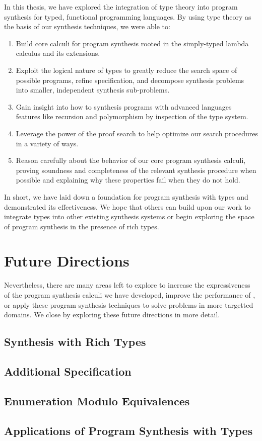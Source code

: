 In this thesis, we have explored the integration of type theory into program synthesis for typed, functional programming languages.
By using type theory as the basis of our synthesis techniques, we were able to:
\begin{enumerate}
  \item Build core calculi for program synthesis rooted in the simply-typed lambda calculus and its extensions.
  \item Exploit the logical nature of types to greatly reduce the search space of possible programs, refine specification, and decompose synthesis problems into smaller, independent synthesis sub-problems.
  \item Gain insight into how to synthesis programs with advanced languages features like recursion and polymorphism by inspection of the type system.
  \item Leverage the power of the proof search to help optimize our search procedures in a variety of ways.
  \item Reason carefully about the behavior of our core program synthesis calculi, proving soundness and completeness of the relevant synthesis procedure when possible and explaining why these properties fail when they do not hold.
\end{enumerate}
In short, we have laid down a foundation for program synthesis with types and demonstrated its effectiveness.
We hope that others can build upon our work to integrate types into other existing synthesis systems or begin exploring the space of program synthesis in the presence of rich types.

\section{Future Directions}
\label{sec:future-directions}

Nevertheless, there are many areas left to explore to increase the expressiveness of the program synthesis calculi we have developed, improve the performance of \myth{}, or apply these program synthesis techniques to solve problems in more targetted domains.
We close by exploring these future directions in more detail.

\subsection{Synthesis with Rich Types}
\label{subsec:synthesis-with-rich-types}

\subsection{Additional Specification}
\label{subsec:additional-specification}

\subsection{Enumeration Modulo Equivalences}
\label{subsec:enumeration-modulo-equivalences}

\subsection{Applications of Program Synthesis with Types}
\label{subsec:applications-of-program-synthesis-with-types}
